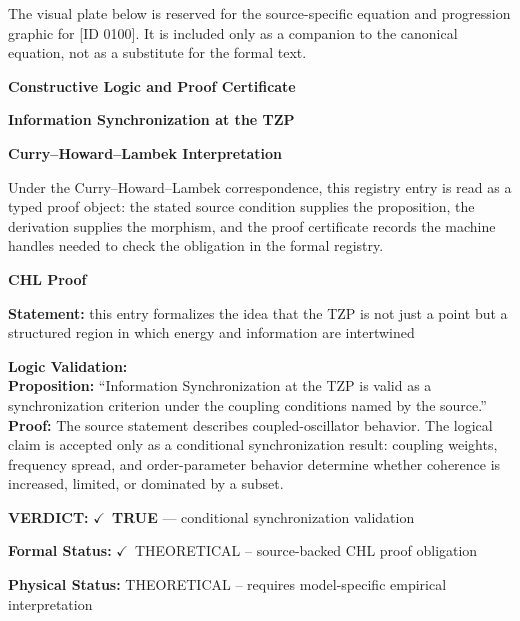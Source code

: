 \begingroup\footnotesize\sloppy
The visual plate below is reserved for the source-specific equation and progression graphic for [ID 0100]. It is included only as a companion to the canonical equation, not as a substitute for the formal text.
\par\endgroup
\ifTZPDarkEdition
{}
\fi

\clearpage
\begingroup\tzpsupportsetup
\noindent\textbf{\fontsize{10.8pt}{12.8pt}\selectfont [ID 0100] Constructive Logic and Proof Certificate}\par
\noindent\textbf{\fontsize{10pt}{12pt}\selectfont Information Synchronization at the TZP}\par
\vspace{0.45em}
\begingroup
\footnotesize
\setlength{\parskip}{0.22em}
\setlength{\parindent}{0pt}
\noindent\textbf{Curry--Howard--Lambek Interpretation}\par
Under the Curry--Howard--Lambek correspondence, this registry entry is read as a typed proof
object: the stated source condition supplies the proposition, the derivation supplies the
morphism, and the proof certificate records the machine handles needed to check the obligation
in the formal registry.

\vspace{0.45em}
\noindent\textbf{CHL Proof}\par
\textbf{Statement:} this entry formalizes the idea that the TZP is not just a point but a structured region
in which energy and information are intertwined

\textbf{Logic Validation:}\\
\textbf{Proposition:} ``Information Synchronization at the TZP is valid as a synchronization criterion under the
coupling conditions named by the source.''\\
\textbf{Proof:} The source statement describes coupled-oscillator behavior. The logical claim is
accepted only as a conditional synchronization result: coupling weights, frequency
spread, and order-parameter behavior determine whether coherence is increased, limited,
or dominated by a subset.

\textbf{VERDICT:} \ensuremath{\checkmark}\ \textbf{TRUE} --- conditional synchronization validation

\textbf{Formal Status:} \ensuremath{\checkmark}\ THEORETICAL -- source-backed CHL proof obligation

\textbf{Physical Status:} THEORETICAL -- requires model-specific empirical interpretation
\par\vspace{0.45em}
\par
\ifTZPDarkEdition
{}
\fi
\endgroup
\endgroup

